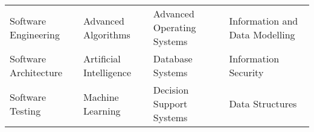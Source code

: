 \vspace{1mm}

\begin{cvparagraph}
\begin{tabular}{ p{4cm} p{4cm} p{5cm} p{4cm}}
Software Engineering&
Advanced Algorithms&
Advanced Operating Systems&
Information and Data Modelling\\
Software Architecture&
Artificial Intelligence&
Database Systems&
Information Security\\
Software Testing&
Machine Learning&
Decision Support Systems&
Data Structures
\\



\end{tabular}
\end{cvparagraph}